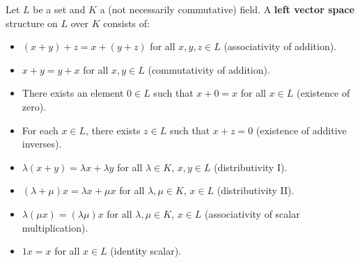 Let $L$ be a set and $K$ a (not necessarily commutative) field. A \textbf{left vector space} structure on $L$ over $K$ consists of:

\begin{itemize}
\item[(1)] $(x + y) + z = x + (y + z)$ for all $x, y, z \in L$ (associativity of addition).
\item[(2)] $x + y = y + x$ for all $x, y \in L$ (commutativity of addition).
\item[(3)] There exists an element $0 \in L$ such that $x + 0 = x$ for all $x \in L$ (existence of zero).
\item[(4)] For each $x \in L$, there exists $z \in L$ such that $x + z = 0$ (existence of additive inverses).
\item[(5)] $\lambda(x + y) = \lambda x + \lambda y$ for all $\lambda \in K$, $x, y \in L$ (distributivity I).
\item[(6)] $(\lambda + \mu)x = \lambda x + \mu x$ for all $\lambda, \mu \in K$, $x \in L$ (distributivity II).
\item[(7)] $\lambda(\mu x) = (\lambda \mu)x$ for all $\lambda, \mu \in K$, $x \in L$ (associativity of scalar multiplication).
\item[(8)] $1x = x$ for all $x \in L$ (identity scalar).
\end{itemize}
